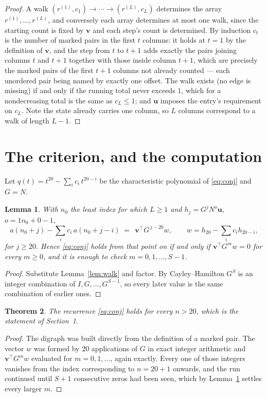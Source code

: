 \documentclass[11pt,a4paper]{article}
\theoremstyle{plain}
\newtheorem{theorem}{Theorem}
\newtheorem{lemma}[theorem]{Lemma}
\theoremstyle{definition}
\begin{document}
\begin{proof}
A walk $(r^{(1)},c_1)\to\cdots\to(r^{(L)},c_L)$ determines the array
$r^{(1)},\dots,r^{(L)}$, and conversely each array determines at most one walk, since the
starting count is fixed by $\mathbf{v}$ and each step's count is determined. By induction
$c_t$ is the number of marked pairs in the first $t$ columns: it holds at $t=1$ by the
definition of $\mathbf{v}$, and the step from $t$ to $t+1$ adds exactly the pairs joining
columns $t$ and $t+1$ together with those inside column $t+1$, which are precisely the marked
pairs of the first $t+1$ columns not already counted --- each unordered pair being named by
exactly one offset. The walk exists (no edge is missing) if and only if the running total
never exceeds $1$, which for a nondecreasing total is the same as $c_L\le1$; and
$\mathbf{u}$ imposes the entry's requirement on $c_L$. Note the state already carries one
column, so $L$ columns correspond to a walk of length $L-1$.
\end{proof}

\section{The criterion, and the computation}

Let $q(t)=t^{20}-\sum_i c_i\,t^{20-i}$ be the characteristic polynomial of
\eqref{eq:conj} and $G=N$.

\begin{lemma}\label{lem:crit}
With $n_0$ the least index for which $L\ge1$ and $h_j=G^{j}N^{o}\mathbf{u}$,
$o=1n_0+0-1$,
\[
a(n_0+j)-\sum_i c_i\,a(n_0+j-i)\;=\;\,\mathbf{v}^{\!\top}G^{\,j-20}w,
\qquad w=h_{20}-\sum_i c_i h_{20-i},
\]
for $j\ge20$. Hence \eqref{eq:conj} holds from that point on if and only if
$\mathbf{v}^{\!\top}G^{m}w=0$ for every $m\ge0$, and it is enough to check
$m=0,1,\dots,S-1$.
\end{lemma}

\begin{proof}
Substitute Lemma~\ref{lem:walk} and factor. By Cayley--Hamilton $G^{S}$ is an integer
combination of $I,G,\dots,G^{S-1}$, so every later value is the same combination of earlier
ones.
\end{proof}

\begin{theorem}
The recurrence \eqref{eq:conj} holds for every $n>20$, which is the statement of
Section~1.
\end{theorem}

\begin{proof}
The digraph was built directly from the definition of a marked pair. The vector $w$ was
formed by $20$ applications of $G$ in exact integer arithmetic and
$\mathbf{v}^{\!\top}G^{m}w$ evaluated for $m=0,1,\dots$, again exactly. Every one of
those integers vanishes from the index corresponding to $n=20+1$ onwards, and the run
continued until $S+1$ consecutive zeros had been seen, which by Lemma~\ref{lem:crit}
settles every larger $m$.
\end{proof}
\end{document}
